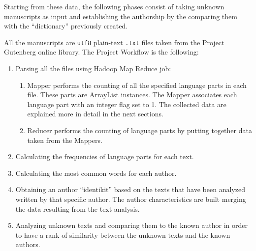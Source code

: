 \documentclass[a4paper,11pt, twoside]{article}
\begin{document}
	\noindent
	Starting from these data, the following phases consist of taking unknown manuscripts as input and establishing the authorship by the comparing them with the ``dictionary'' previously created. 
	
	\noindent
	All the manuscripts are \texttt{utf8} plain-text \texttt{.txt} files taken from the Project Gutenberg \parencite{Gutenberg} online library.
	The Project Workflow is the following:
	\begin{enumerate}
		\item Parsing all the files using Hadoop Map Reduce job: 
		\begin{enumerate}
			\item Mapper performs the counting of all the specified language parts in each file. These parts are ArrayList instances. The Mapper associates each language part with an integer flag set to 1. The collected data are explained more in detail in the next sections. 
			
			\item Reducer performs the counting of language parts by putting together data taken from the Mappers.
		\end{enumerate}
		\item Calculating the frequencies of language parts for each text.
		\item Calculating the most common words for each author.
		\item Obtaining an author ``identikit'' based on the texts that have been analyzed written by that specific author. The author characteristics are built merging the data resulting from the text analysis.
		\item Analyzing unknown texts and comparing them to the known author in order to have a rank of similarity between the unknown texts and the known authors.
	\end{enumerate}
\end{document}
